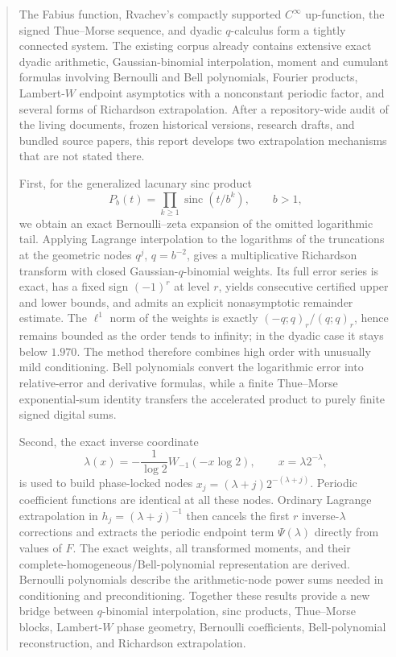 \documentclass[11pt]{article}
\numberwithin{equation}{section}
\theoremstyle{definition}
\theoremstyle{remark}
\newcommand{\sinc}{\operatorname{sinc}}
\begin{document}
\begin{abstract}
The Fabius function, Rvachev's compactly supported $C^\infty$ up-function, the signed Thue--Morse sequence, and dyadic $q$-calculus form a tightly connected system. The existing \repoPartll{} corpus already contains extensive exact dyadic arithmetic, Gaussian-binomial interpolation, moment and cumulant formulas involving Bernoulli and Bell polynomials, Fourier products, Lambert-$W$ endpoint asymptotics with a nonconstant periodic factor, and several forms of Richardson extrapolation. After a repository-wide audit of the living documents, frozen historical versions, research drafts, and bundled source papers, this report develops two extrapolation mechanisms that are not stated there.

First, for the generalized lacunary sinc product
\[
P_b(t)=\prod_{k\ge 1}\sinc(t/b^k),\qquad b>1,
\]
we obtain an exact Bernoulli--zeta expansion of the omitted logarithmic tail. Applying Lagrange interpolation to the logarithms of the truncations at the geometric nodes $q^j$, $q=b^{-2}$, gives a multiplicative Richardson transform with closed Gaussian-$q$-binomial weights. Its full error series is exact, has a fixed sign $(-1)^r$ at level $r$, yields consecutive certified upper and lower bounds, and admits an explicit nonasymptotic remainder estimate. The $\ell^1$ norm of the weights is exactly $(-q;q)_r/(q;q)_r$, hence remains bounded as the order tends to infinity; in the dyadic case it stays below $1.970$. The method therefore combines high order with unusually mild conditioning. Bell polynomials convert the logarithmic error into relative-error and derivative formulas, while a finite Thue--Morse exponential-sum identity transfers the accelerated product to purely finite signed digital sums.

Second, the exact inverse coordinate
\[
\lambda(x)=-\frac{1}{\log 2}W_{-1}(-x\log 2),\qquad x=\lambda 2^{-\lambda},
\]
is used to build phase-locked nodes $x_j=(\lambda+j)2^{-(\lambda+j)}$. Periodic coefficient functions are identical at all these nodes. Ordinary Lagrange extrapolation in $h_j=(\lambda+j)^{-1}$ then cancels the first $r$ inverse-$\lambda$ corrections and extracts the periodic endpoint term $\Psi(\lambda)$ directly from values of $F$. The exact weights, all transformed moments, and their complete-homogeneous/Bell-polynomial representation are derived. Bernoulli polynomials describe the arithmetic-node power sums needed in conditioning and preconditioning. Together these results provide a new bridge between $q$-binomial interpolation, sinc products, Thue--Morse blocks, Lambert-$W$ phase geometry, Bernoulli coefficients, Bell-polynomial reconstruction, and Richardson extrapolation.
\end{abstract}
\end{document}
